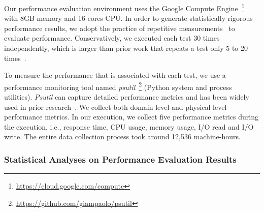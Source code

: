 
Our performance evaluation environment uses the Google Compute Engine~\footnote{\url{https://cloud.google.com/compute}} with 8GB memory and 16 cores CPU. In order to generate statistically rigorous performance results, we adopt the practice of repetitive measurements~\cite{peterfse} to evaluate performance. Conservatively, we executed each test 30 times independently, which is larger than prior work that  %
repeats a test only 5 to 20 times~\cite{Laaber2018MSR, Leitner2016TIT,DBLP:journals/ese/LaaberSL19}. 

To measure the performance that is associated with each test, we %
use a performance monitoring tool named \emph{psutil}~\footnote{\url{https://github.com/giampaolo/psutil}} (Python system and process utilities). %
\emph{Psutil} can capture detailed performance metrics and has been widely used in prior research~\cite{DBLP:conf/icsm/ChenS17,DBLP:conf/wosp/YaoPSSTS18}. We collect both domain level and physical level performance metrics. In our execution, we collect five performance metrics during the execution, i.e., response time, CPU usage, memory usage, I/O read and I/O write.
The entire data collection process took around 12,536 machine-hours.

\subsubsection{Statistical Analyses on Performance Evaluation Results}
\label{sec:statisticalAnalysis}

